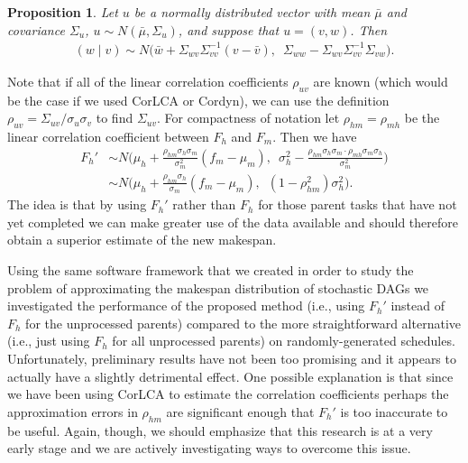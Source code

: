 \documentclass[12pt]{article}
\newtheorem{prop}[theorem]{Proposition}
\begin{document}
\begin{prop}
	Let $u$ be a normally distributed vector with mean $\bar{\mu}$ and covariance $\Sigma_u$, $u \sim N(\bar{\mu}, \Sigma_u)$, and suppose that $u = (v, w)$. Then 
	\begin{align*}
	(w \mid v) \sim N \big( \bar{w} + \Sigma_{wv}\Sigma_{vv}^{-1} (v - \bar{v}), \enspace  \Sigma_{ww} - \Sigma_{wv} \Sigma_{vv}^{-1} \Sigma_{vw} \big).
	\end{align*}
\end{prop}
Note that if all of the linear correlation coefficients $\rho_{uv}$ are known (which would be the case if we used CorLCA or Cordyn), we can use the definition $\rho_{uv} = \Sigma_{uv} / \sigma_u \sigma_v$ to find $\Sigma_{uv}$. For compactness of notation let $\rho_{hm} = \rho_{mh}$ be the linear correlation coefficient between $F_h$ and $F_m$. Then we have 
\begin{align*}
F_h' &\sim N \bigg( \mu_{h} + \frac{\rho_{hm} \sigma_{h} \sigma_{m}}{\sigma_{m}^2} (f_m - \mu_{m}), \enspace \sigma_{h}^2 - \frac{\rho_{hm} \sigma_{h} \sigma_{m} \cdot \rho_{mh} \sigma_{m} \sigma_{h}}{\sigma_{m}^2} \bigg) \nonumber\\
&\sim N \bigg(\mu_{h} + \frac{\rho_{hm} \sigma_{h}}{\sigma_{m}} (f_m - \mu_{m}), \enspace (1 - \rho_{hm}^2) \sigma_{h}^2 \bigg).
\end{align*} 
The idea is that by using $F_h'$ rather than $F_h$ for those parent tasks that have not yet completed we can make greater use of the data available and should therefore obtain a superior estimate of the new makespan.  

Using the same software framework that we created in order to study the problem of approximating the makespan distribution of stochastic DAGs we investigated the performance of the proposed method (i.e., using $F_h'$ instead of $F_h$ for the unprocessed parents) compared to the more straightforward alternative (i.e., just using $F_h$ for all unprocessed parents) on randomly-generated schedules. Unfortunately, preliminary results have not been too promising and it appears to actually have a slightly detrimental effect. One possible explanation is that since we have been using CorLCA to estimate the correlation coefficients perhaps the approximation errors in $\rho_{hm}$ are significant enough that $F_h'$ is too inaccurate to be useful. Again, though, we should emphasize that this research is at a very early stage and we are actively investigating ways to overcome this issue. 




\end{document}
